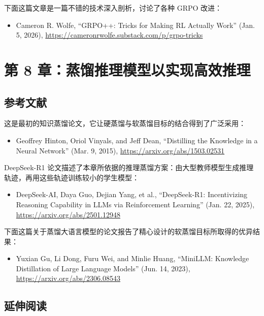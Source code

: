 下面这篇文章是一篇不错的技术深入剖析，讨论了各种 GRPO 改进：

\begin{itemize}
\item Cameron R. Wolfe, “GRPO++: Tricks for Making RL Actually Work” (Jan. 5, 2026), \href{https://cameronrwolfe.substack.com/p/grpo-tricks}{https://cameronrwolfe.substack.com/p/grpo-tricks}
\end{itemize}

\section{第 8 章：蒸馏推理模型以实现高效推理}

\subsection{参考文献}

这是最初的知识蒸馏论文，它让硬蒸馏与软蒸馏目标的结合得到了广泛采用：

\begin{itemize}
\item Geoffrey Hinton, Oriol Vinyals, and Jeff Dean, “Distilling the Knowledge in a Neural Network” (Mar. 9, 2015), \href{https://arxiv.org/abs/1503.02531}{https://arxiv.org/abs/1503.02531}
\end{itemize}

DeepSeek-R1 论文描述了本章所依据的推理蒸馏方案：由大型教师模型生成推理轨迹，再用这些轨迹训练较小的学生模型：

\begin{itemize}
\item DeepSeek-AI, Daya Guo, Dejian Yang, et al., “DeepSeek-R1: Incentivizing Reasoning Capability in LLMs via Reinforcement Learning” (Jan. 22, 2025), \href{https://arxiv.org/abs/2501.12948}{https://arxiv.org/abs/2501.12948}
\end{itemize}

下面这篇关于蒸馏大语言模型的论文报告了精心设计的软蒸馏目标所取得的优异结果：

\begin{itemize}
\item Yuxian Gu, Li Dong, Furu Wei, and Minlie Huang, “MiniLLM: Knowledge Distillation of Large Language Models” (Jun. 14, 2023), \href{https://arxiv.org/abs/2306.08543}{https://arxiv.org/abs/2306.08543}
\end{itemize}

\subsection{延伸阅读}

